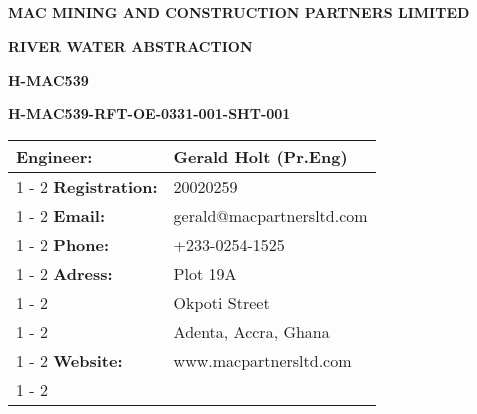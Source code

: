 \documentclass{article}%
\begin{document}
%
\pagestyle{empty}%
\normalsize%
\pagestyle{header}%
\begin{center}%
\section*{}%
\label{sec:}%
\begin{minipage}{\textwidth}%
\centering%
\begin{Large}%
\textbf{MAC MINING AND CONSTRUCTION PARTNERS LIMITED}%
\end{Large}%
\vspace*{20pt}%
\linebreak%
\begin{large}%
\textbf{RIVER WATER ABSTRACTION}%
\end{large}%
\vspace*{20pt}%
\linebreak%
\begin{large}%
\textbf{H{-}MAC539}%
\end{large}%
\vspace*{20pt}%
\linebreak%
\begin{large}%
\textbf{H{-}MAC539{-}RFT{-}OE{-}0331{-}001{-}SHT{-}001}%
\end{large}%
\vspace*{80pt}%
\end{minipage}

%
\end{center}%
\begin{center}%
\begin{minipage}{\textwidth}%
\flushleft%
\begin{tabular}{|l |l |}%
\hline%
\textbf{Engineer:}&Gerald Holt (Pr.Eng)\\%
\cline{1%
-%
2}%
\textbf{Registration:}&20020259\\%
\cline{1%
-%
2}%
\textbf{Email:}&gerald@macpartnersltd.com\\%
\cline{1%
-%
2}%
\textbf{Phone:}&+233{-}0254{-}1525\\%
\cline{1%
-%
2}%
\textbf{Adress:}&Plot 19A\\%
\cline{1%
-%
2}%
\textbf{}&Okpoti Street\\%
\cline{1%
-%
2}%
\textbf{}&Adenta, Accra, Ghana\\%
\cline{1%
-%
2}%
\textbf{Website:}&www.macpartnersltd.com\\%
\cline{1%
-%
2}%
\end{tabular}%
\vspace*{150pt}%
\centering%
\end{minipage}%
\end{center}%
\end{document}

